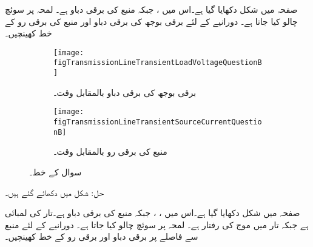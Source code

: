 صفحہ  میں شکل  دکھایا گیا ہے۔اس میں ،
  جبکہ منبع کی برقی دباو  ہے۔ لمحہ  پر سوئچ چالو کیا جاتا ہے۔ دورانیے کے لئے برقی بوجھ کی برقی دباو اور  منبع کی برقی رو کے خط کھینچیں۔

\begin{figure}
\centering
\begin{subfigure}{0.8\textwidth}
\centering
\texttt{[image: figTransmissionLineTransientLoadVoltageQuestionB]}
\caption{ برقی بوجھ کی برقی دباو بالمقابل وقت۔}
\label{شکل_ترسیلی_جواب_سوال_ب}
\end{subfigure}%

\begin{subfigure}{0.8\textwidth}
\centering
\texttt{[image: figTransmissionLineTransientSourceCurrentQuestionB]}
\caption{منبع کی برقی رو بالمقابل وقت۔}
\label{شکل_ترسیلی_جواب_منبع_رو_سوال_ب}
\end{subfigure}%
\caption{سوال  کے خط۔}
\label{شکل_سوال_ترسیلی_سوال_ب}
\end{figure}
حل: شکل   میں دکھائے گئے ہیں۔


صفحہ  میں شکل  دکھایا گیا ہے۔اس میں ،
 ،   جبکہ منبع کی برقی دباو  ہے۔تار کی لمبائی  ہے جبکہ تار میں موج کی رفتار  ہے۔ لمحہ  پر سوئچ چالو کیا جاتا ہے۔ دورانیے کے لئے منبع سے  فاصلے پر  برقی دباو اور برقی رو کے خط کھینچیں۔

